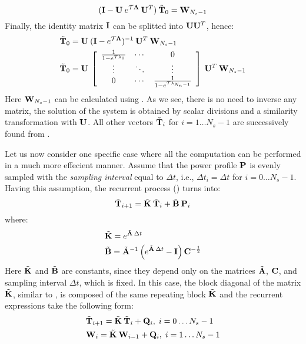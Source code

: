 \[
  (\mathbf{I} - \mathbf{U} \: e^{\mathcal{T} \mathbf{\Lambda}} \: \mathbf{U}^T) \: \tilde{\mathbf{T}}_0 = \mathbf{W}_{N_s - 1}
\]
Finally, the identity matrix $\mathbf{I}$ can be splitted into $\mathbf{U} \mathbf{U}^T$, hence:
\begin{align*}
  & \tilde{\mathbf{T}}_0 = \mathbf{U} \: (\mathbf{I} - e^{\mathcal{T} \mathbf{\Lambda}})^{-1} \: \mathbf{U}^T \: \mathbf{W}_{N_s - 1} \\
  & \tilde{\mathbf{T}}_0 = \mathbf{U} \: \left[
      \begin{array}{ccc}
        \frac{1}{1 - e^{\mathcal{T} \lambda_0}} & \cdots & 0 \\
        \vdots & \ddots & \vdots \\
        0 & \cdots & \frac{1}{1 - e^{\mathcal{T} \lambda_{N_n - 1}}}
      \end{array}
    \right] \: \mathbf{U}^T \: \mathbf{W}_{N_s - 1}
\end{align*}
Here $\mathbf{W}_{N_s - 1}$ can be calculated using . As we see, there is no need to inverse any matrix, the solution of the system is obtained by scalar divisions and a similarity transformation with $\mathbf{U}$. All other vectors $\tilde{\mathbf{T}}_i$ for $i = 1 \dots N_s - 1$ are successively found from .

Let us now consider one specific case where all the computation can be performed in a much more effecient manner. Assume that the power profile $\mathbb{\mathbf{P}}$ is evenly sampled with the \emph{sampling interval} equal to $\Delta t$, i.e., $\Delta t_i = \Delta t$ for $i = 0 \dots N_s - 1$. Having this assumption, the recurrent process () turns into:
\[
  \tilde{\mathbf{T}}_{i+1} = \tilde{\mathbf{K}} \: \tilde{\mathbf{T}}_i + \tilde{\mathbf{B}} \: \mathbf{P}_i
\]
where:
\begin{align*}
  & \tilde{\mathbf{K}} = e^{\tilde{\mathbf{A}} \: \Delta t} \\
  & \tilde{\mathbf{B}} = \tilde{\mathbf{A}}^{-1} \left( e^{\tilde{\mathbf{A}} \: \Delta t} - \mathbf{I} \right) \mathbf{C}^{-\frac{1}{2}}
\end{align*}
Here $\tilde{\mathbf{K}}$ and $\tilde{\mathbf{B}}$ are constants, since they depend only on the matrices $\tilde{\mathbf{A}}$, $\mathbf{C}$, and sampling interval $\Delta t$, which is fixed. In this case, the block diagonal of the matrix $\tilde{\mathbb{\mathbf{K}}}$, similar to , is composed of the same repeating block $\tilde{\mathbf{K}}$ and the recurrent expressions take the following form:
\begin{align}
  & \tilde{\mathbf{T}}_{i + 1} = \tilde{\mathbf{K}} \: \tilde{\mathbf{T}}_i + \mathbf{Q}_i, \; i = 0 \dots N_s - 1 \nonumber \\
  & \mathbf{W}_i = \tilde{\mathbf{K}} \: \mathbf{W}_{i - 1} + \mathbf{Q}_i, \; i = 1 \dots N_s - 1 \nonumber
\end{align}
